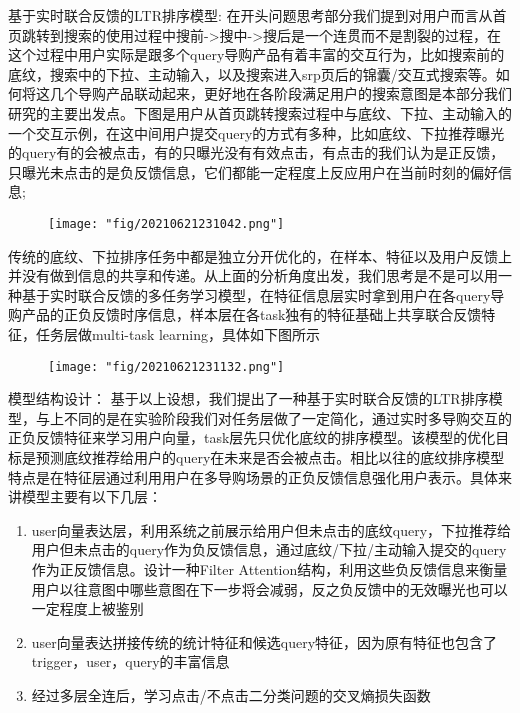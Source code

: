 基于实时联合反馈的LTR排序模型: 在开头问题思考部分我们提到对用户而言从首页跳转到搜索的使用过程中搜前->搜中->搜后是一个连贯而不是割裂的过程，在这个过程中用户实际是跟多个query导购产品有着丰富的交互行为，比如搜索前的底纹，搜索中的下拉、主动输入，以及搜索进入srp页后的锦囊/交互式搜索等。如何将这几个导购产品联动起来，更好地在各阶段满足用户的搜索意图是本部分我们研究的主要出发点。下图是用户从首页跳转搜索过程中与底纹、下拉、主动输入的一个交互示例，在这中间用户提交query的方式有多种，比如底纹、下拉推荐曝光的query有的会被点击，有的只曝光没有有效点击，有点击的我们认为是正反馈，只曝光未点击的是负反馈信息，它们都能一定程度上反应用户在当前时刻的偏好信息;

\begin{figure}[!h]
	\centering
	\texttt{[image: "fig/20210621231042.png"]}
	\caption{}
	\label{fig:20210621231042}
\end{figure}

传统的底纹、下拉排序任务中都是独立分开优化的，在样本、特征以及用户反馈上并没有做到信息的共享和传递。从上面的分析角度出发，我们思考是不是可以用一种基于实时联合反馈的多任务学习模型，在特征信息层实时拿到用户在各query导购产品的正负反馈时序信息，样本层在各task独有的特征基础上共享联合反馈特征，任务层做multi-task learning，具体如下图所示

\begin{figure}[!h]
	\centering
	\texttt{[image: "fig/20210621231132.png"]}
	\caption{}
	\label{fig:20210621231132}
\end{figure}

模型结构设计： 基于以上设想，我们提出了一种基于实时联合反馈的LTR排序模型，与上不同的是在实验阶段我们对任务层做了一定简化，通过实时多导购交互的正负反馈特征来学习用户向量，task层先只优化底纹的排序模型。该模型的优化目标是预测底纹推荐给用户的query在未来是否会被点击。相比以往的底纹排序模型特点是在特征层通过利用用户在多导购场景的正负反馈信息强化用户表示。具体来讲模型主要有以下几层： 

\begin{enumerate}

	\item user向量表达层，利用系统之前展示给用户但未点击的底纹query，下拉推荐给用户但未点击的query作为负反馈信息，通过底纹/下拉/主动输入提交的query作为正反馈信息。设计一种Filter Attention结构，利用这些负反馈信息来衡量用户以往意图中哪些意图在下一步将会减弱，反之负反馈中的无效曝光也可以一定程度上被鉴别

	\item user向量表达拼接传统的统计特征和候选query特征，因为原有特征也包含了trigger，user，query的丰富信息

	\item 经过多层全连后，学习点击/不点击二分类问题的交叉熵损失函数

\end{enumerate}




